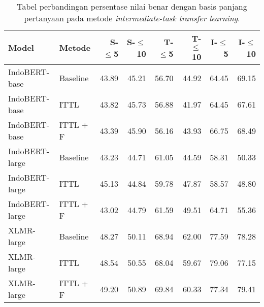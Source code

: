 \begin{table}[H]\centering
\begin{tabular}{llrrrrrr}
\toprule
         Model &   Metode &  S-$\leq$5 &  S-$\leq$10 &  T-$\leq$5 &  T-$\leq$10 &  I-$\leq$5 &  I-$\leq$10 \\
\midrule
 IndoBERT-base & Baseline &                   43.89 &                    45.21 &                   56.70 &                    44.92 &                   64.45 &                    69.15 \\
 IndoBERT-base &     ITTL &                   43.82 &                    45.73 &                   56.88 &                    41.97 &                   64.45 &                    67.61 \\
 IndoBERT-base & ITTL + F &                   43.39 &                    45.90 &                   56.16 &                    43.93 &                   66.75 &                    68.49 \\
\hline
IndoBERT-large & Baseline &                   43.23 &                    44.71 &                   61.05 &                    44.59 &                   58.31 &                    50.33 \\
IndoBERT-large &     ITTL &                   45.13 &                    44.84 &                   59.78 &                    47.87 &                   58.57 &                    48.80 \\
IndoBERT-large & ITTL + F &                   43.02 &                    44.79 &                   61.59 &                    49.51 &                   64.71 &                    55.36 \\
\hline
    XLMR-large & Baseline &                   48.27 &                    50.11 &                   68.94 &                    62.00 &                   77.59 &                    78.28 \\
    XLMR-large &     ITTL &                   48.54 &                    50.55 &                   68.04 &                    59.67 &                   79.06 &                    77.15 \\
    XLMR-large & ITTL + F &                   49.20 &                    50.89 &                   69.84 &                    60.33 &                   77.34 &                    79.41 \\
\bottomrule
\end{tabular}
\caption{Tabel perbandingan persentase nilai benar dengan basis panjang pertanyaan pada metode \emph{intermediate-task transfer learning}.}
\end{table}

